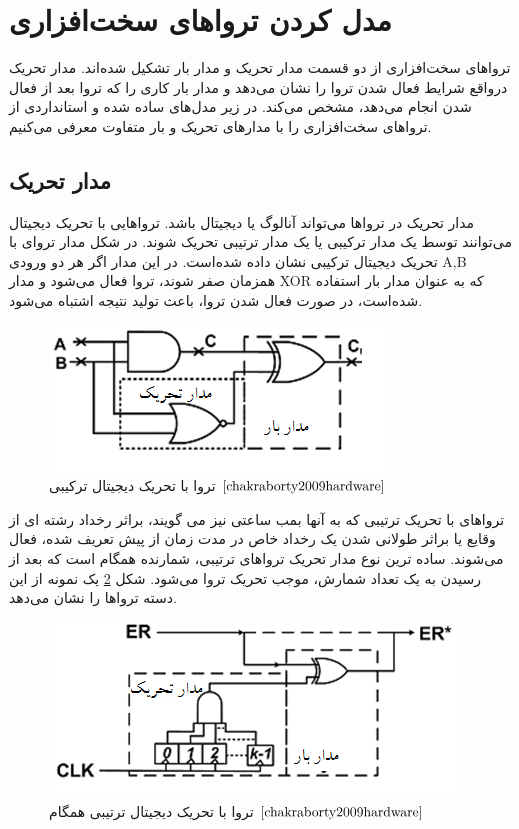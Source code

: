 \section {مدل کردن تروا‌های سخت‌افزاری}
تروا‌های سخت‌افزاری از دو قسمت مدار تحریک و مدار بار   تشکیل شده‌اند. مدار تحریک درواقع شرایط فعال شدن تروا را نشان می‌دهد و مدار بار کاری را که تروا بعد از فعال شدن انجام می‌دهد، مشخص می‌کند. در زیر مدل‌های ساده شده و استانداردی از تروا‌های سخت‌افزاری را با مدارهای تحریک و بار متفاوت معرفی می‌کنیم.

\subsection {مدار تحریک}

مدار تحریک در تروا‌ها می‌تواند آنالوگ یا دیجیتال باشد. تروا‌هایی با تحریک دیجیتال می‌توانند توسط یک مدار ترکیبی یا یک مدار ترتیبی تحریک شوند.  در شکل  مدار تروای با تحریک دیجیتال ترکیبی نشان داده شده‌است. در این مدار اگر هر دو ورودی A,B همزمان صفر شوند، تروا فعال می‌شود و مدار XOR که به عنوان مدار بار استفاده شده‌است، در صورت فعال شدن تروا، باعث تولید نتیجه اشتباه می‌شود.

\begin{figure}
	\begin{center}
		\includegraphics[scale=1]{figs/fig3-1.png}
		\caption[تروا با تحریک دیجیتال ترکیبی]
		{تروا با تحریک دیجیتال ترکیبی $\cite{chakraborty2009hardware}$}
		\label{fig3-1}
	\end{center}
\end{figure}

تروا‌های با تحریک ترتیبی که به آنها بمب ساعتی نیز می گویند، براثر رخداد رشته ای از وقایع یا براثر طولانی شدن یک رخداد خاص در مدت زمان از پیش تعریف شده، فعال می‌شوند. ساده ترین نوع مدار تحریک تروا‌های ترتیبی، شمارنده همگام است که بعد از رسیدن به یک تعداد شمارش، موجب تحریک تروا می‌شود. شکل \ref{fig2-3} یک نمونه از این دسته تروا‌ها را نشان می‌دهد.
\begin{figure}
	\begin{center}
		\includegraphics[scale=1]{figs/fig2-3.png}
		\caption[تروا با تحریک دیجیتال ترتیبی همگام]
		{تروا با تحریک دیجیتال ترتیبی همگام $\cite{chakraborty2009hardware}$}
		\label{fig2-3}
	\end{center}
\end{figure}

